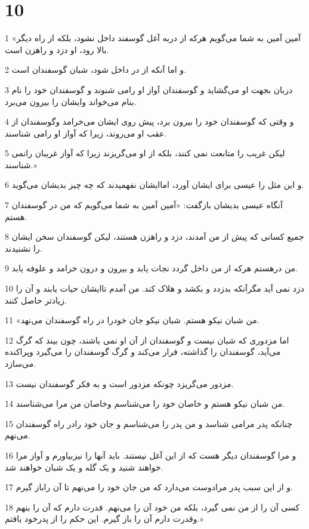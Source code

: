 \chapter{10}

\par 1 «آمین آمین به شما می‌گویم هر‌که از دربه آغل گوسفند داخل نشود، بلکه از راه دیگر بالا رود، او دزد و راهزن است.
\par 2 و اما آنکه از در داخل شود، شبان گوسفندان است.
\par 3 دربان بجهت او می‌گشاید و گوسفندان آواز او رامی شنوند و گوسفندان خود را نام بنام می‌خواند وایشان را بیرون می‌برد.
\par 4 و وقتی که گوسفندان خود را بیرون برد، پیش روی ایشان می‌خرامد وگوسفندان از عقب او می‌روند، زیرا که آواز او رامی شناسند.
\par 5 لیکن غریب را متابعت نمی کنند، بلکه از او می‌گریزند زیرا که آواز غریبان رانمی شناسند.»
\par 6 و این مثل را عیسی برای ایشان آورد، اماایشان نفهمیدند که چه چیز بدیشان می‌گوید.
\par 7 آنگاه عیسی بدیشان باز‌گفت: «آمین آمین به شما می‌گویم که من در گوسفندان هستم.
\par 8 جمیع کسانی که پیش از من آمدند، دزد و راهزن هستند، لیکن گوسفندان سخن ایشان را نشنیدند.
\par 9 من درهستم هر‌که از من داخل گردد نجات یابد و بیرون و درون خرامد و علوفه یابد.
\par 10 دزد نمی آید مگرآنکه بدزدد و بکشد و هلاک کند. من آمدم تاایشان حیات یابند و آن را زیادتر حاصل کنند.
\par 11 «من شبان نیکو هستم. شبان نیکو جان خودرا در راه گوسفندان می‌نهد.
\par 12 اما مزدوری که شبان نیست و گوسفندان از آن او نمی باشند، چون بیند که گرگ می‌آید، گوسفندان را گذاشته، فرار می‌کند و گرگ گوسفندان را می‌گیرد وپراکنده می‌سازد.
\par 13 مزدور می‌گریزد چونکه مزدور است و به فکر گوسفندان نیست.
\par 14 من شبان نیکو هستم و خاصان خود را می‌شناسم وخاصان من مرا می‌شناسند.
\par 15 چنانکه پدر مرامی شناسد و من پدر را می‌شناسم و جان خود رادر راه گوسفندان می‌نهم.
\par 16 و مرا گوسفندان دیگر هست که از این آغل نیستند. باید آنها را نیزبیاورم و آواز مرا خواهند شنید و یک گله و یک شبان خواهند شد.
\par 17 و از این سبب پدر مرادوست می‌دارد که من جان خود را می‌نهم تا آن راباز گیرم.
\par 18 کسی آن را از من نمی گیرد، بلکه من خود آن را می‌نهم. قدرت دارم که آن را بنهم وقدرت دارم آن را باز گیرم. این حکم را از پدرخود یافتم.»
